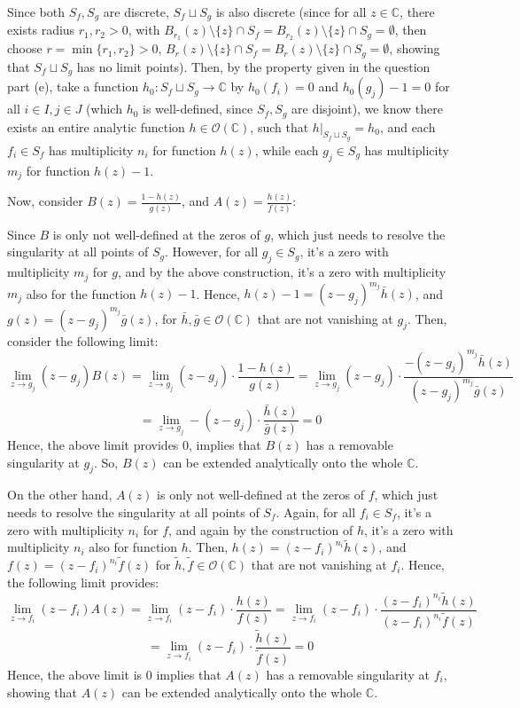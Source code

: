 \documentclass{article}
\begin{document}
\begin{itemize}
    \hfil

    Since both $S_f,S_g$ are discrete, $S_f\sqcup S_g$ is also discrete (since for all $z\in\mathbb{C}$, there exists radius $r_1,r_2>0$, with $B_{r_1}(z)\setminus\{z\}\cap S_f=B_{r_2}(z)\setminus\{z\}\cap S_g=\emptyset$, then choose $r=\min\{r_1,r_2\}>0$, $B_r(z)\setminus\{z\}\cap S_f=B_r(z)\setminus\{z\}\cap S_g=\emptyset$, showing that $S_f\sqcup S_g$ has no limit points).
    Then, by the property given in the question part (e), take a function $h_0:S_f\sqcup S_g\rightarrow\mathbb{C}$ by $h_0(f_i)=0$ and $h_0(g_j)-1=0$ for all $i\in I,j\in J$ (which $h_0$ is well-defined, since $S_f,S_g$ are disjoint), we know there exists an entire analytic function $h\in\mathcal{O}(\mathbb{C})$, such that $h|_{S_f\sqcup S_g}=h_0$, and each $f_i\in S_f$ has multiplicity $n_i$ for function $h(z)$, while each $g_j\in S_g$ has multiplicity $m_j$ for function $h(z)-1$.

    \hfil

    Now, consider $B(z)=\frac{1-h(z)}{g(z)}$, and $A(z)=\frac{h(z)}{f(z)}$: 

    Since $B$ is only not well-defined at the zeros of $g$, which just needs to resolve the singularity at all points of $S_g$. However, for all $g_j\in S_g$, it's a zero with multiplicity $m_j$ for $g$, and by the above construction, it's a zero with multiplicity $m_j$ also for the function $h(z)-1$.
    Hence, $h(z)-1=(z-g_j)^{m_j}\bar{h}(z)$, and $g(z)=(z-g_j)^{m_j}\bar{g}(z)$, for $\bar{h},\bar{g}\in\mathcal{O}(\mathbb{C})$ that are not vanishing at $g_j$. Then, consider the following limit:
    $$\lim_{z\rightarrow g_j}(z-g_j)B(z)=\lim_{z\rightarrow g_j}(z-g_j)\cdot\frac{1-h(z)}{g(z)}=\lim_{z\rightarrow g_j}(z-g_j)\cdot\frac{-(z-g_j)^{m_j}\bar{h}(z)}{(z-g_j)^{m_j}\bar{g}(z)}$$
    $$=\lim_{z\rightarrow g_j}-(z-g_j)\cdot\frac{\bar{h}(z)}{\bar{g}(z)}=0$$
    Hence, the above limit provides $0$, implies that $B(z)$ has a removable singularity at $g_j$. So, $B(z)$ can be extended analytically onto the whole $\mathbb{C}$.

    On the other hand, $A(z)$ is only not well-defined at the zeros of $f$, which just needs to resolve the singularity at all points of $S_f$. Again, for all $f_i\in S_f$, it's a zero with multiplicity $n_i$ for $f$, and again by the construction of $h$, it's a zero with multiplicity $n_i$ also for function $h$.
    Then, $h(z)=(z-f_i)^{n_i}\tilde{h}(z)$, and $f(z)=(z-f_i)^{n_i}\tilde{f}(z)$ for $\tilde{h},\tilde{f}\in\mathcal{O}(\mathbb{C})$ that are not vanishing at $f_i$. Hence, the following limit provides:
    $$\lim_{z\rightarrow f_i}(z-f_i)A(z)=\lim_{z\rightarrow f_i}(z-f_i)\cdot\frac{h(z)}{f(z)}=\lim_{z\rightarrow f_i}(z-f_i)\cdot\frac{(z-f_i)^{n_i}\tilde{h}(z)}{(z-f_i)^{n_i}\tilde{f}(z)}$$
    $$=\lim_{z\rightarrow f_i}(z-f_i)\cdot\frac{\tilde{h}(z)}{\tilde{f}(z)}=0$$
    Hence, the above limit is $0$ implies that $A(z)$ has a removable singularity at $f_i$, showing that $A(z)$ can be extended analytically onto the whole $\mathbb{C}$.


\end{itemize}
\end{document}
